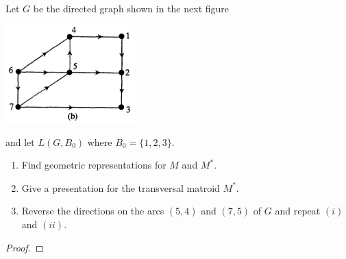 \prob
{
    Let $G$ be the directed graph shown in the next figure 
		            \begin{center}
                \includegraphics[width=5cm]{Test2/Problem13/Figure2_17.png}
            \end{center}\pn
		and let $L(G, B_0)$ where $B_0 = \{1,2,3\}$. 
    \begin{enumerate}[label=(\roman*)]
        \item   Find geometric representations for $M$ and $M^*$.
        \item   Give a presentation for the transversal matroid $M^*$.
        \item   Reverse the directions on the arcs $(5,4)$ and $(7,5)$ of $G$
                and repeat $(i)$ and $(ii)$.
    \end{enumerate}
}
\begin{proof}
\end{proof}